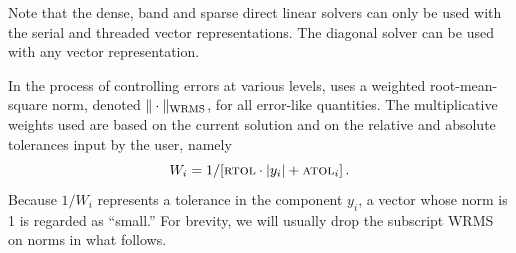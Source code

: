 Note that the dense, band and sparse direct linear solvers can only be 
used with the serial and threaded vector representations.  The
diagonal solver can be used with any vector representation.

In the process of controlling errors at various levels, {\cvodes} uses a
weighted root-mean-square norm, denoted $\|\cdot\|_{\mbox{\scriptsize WRMS}}$,
for all error-like quantities.  The multiplicative weights used are
based on the current solution and on the relative and absolute
tolerances input by the user, namely
\begin{equation}\label{e:errwt}
 W_i = 1 / [\mbox{\sc rtol} \cdot |y_i| + \mbox{\sc atol}_i ] \, .
\end{equation}
Because $1/W_i$ represents a tolerance in the component $y_i$, a vector
whose norm is 1 is regarded as ``small.''  For brevity, we will
usually drop the subscript WRMS on norms in what follows.

